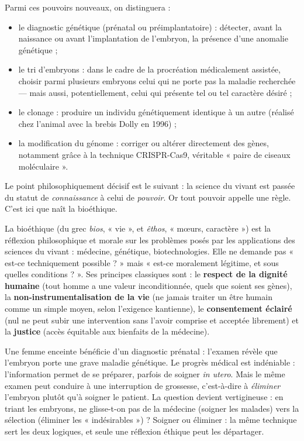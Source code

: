 \documentclass[11pt]{article}
\newcommand{\cle}[1]{{\popxbold\color{popdark}#1}}
\begin{document}
Parmi ces pouvoirs nouveaux, on distinguera :
\begin{itemize}
\item le \cle{diagnostic génétique} (prénatal ou préimplantatoire) : détecter, avant la naissance ou avant l'implantation de l'embryon, la présence d'une anomalie génétique ;
\item le \cle{tri d'embryons} : dans le cadre de la procréation médicalement assistée, choisir parmi plusieurs embryons celui qui ne porte pas la maladie recherchée — mais aussi, potentiellement, celui qui présente tel ou tel caractère désiré ;
\item le \cle{clonage} : produire un individu génétiquement identique à un autre (réalisé chez l'animal avec la brebis Dolly en 1996) ;
\item la \cle{modification du génome} : corriger ou altérer directement des gènes, notamment grâce à la technique CRISPR-Cas9, véritable « paire de ciseaux moléculaire ».
\end{itemize}

Le point philosophiquement décisif est le suivant : la science du vivant est passée du statut de \emph{connaissance} à celui de \emph{pouvoir}. Or tout pouvoir appelle une règle. C'est ici que naît la bioéthique.

\begin{definition}[La bioéthique]
La \cle{bioéthique} (du grec \emph{bios}, « vie », et \emph{êthos}, « mœurs, caractère ») est la réflexion philosophique et morale sur les problèmes posés par les applications des sciences du vivant : médecine, génétique, biotechnologies. Elle ne demande pas « est-ce techniquement possible ? » mais « est-ce moralement légitime, et sous quelles conditions ? ». Ses principes classiques sont : le \textbf{respect de la dignité humaine} (tout homme a une valeur inconditionnée, quels que soient ses gènes), la \textbf{non-instrumentalisation de la vie} (ne jamais traiter un être humain comme un simple moyen, selon l'exigence kantienne), le \textbf{consentement éclairé} (nul ne peut subir une intervention sans l'avoir comprise et acceptée librement) et la \textbf{justice} (accès équitable aux bienfaits de la médecine).
\end{definition}

\begin{exemplebox}
Une femme enceinte bénéficie d'un diagnostic prénatal : l'examen révèle que l'embryon porte une grave maladie génétique. Le progrès médical est indéniable : l'information permet de se préparer, parfois de soigner \emph{in utero}. Mais le même examen peut conduire à une interruption de grossesse, c'est-à-dire à \emph{éliminer} l'embryon plutôt qu'à soigner le patient. La question devient vertigineuse : en triant les embryons, ne glisse-t-on pas de la médecine (soigner les malades) vers la sélection (éliminer les « indésirables ») ? Soigner ou éliminer : la même technique sert les deux logiques, et seule une réflexion éthique peut les départager.
\end{exemplebox}
\end{document}
